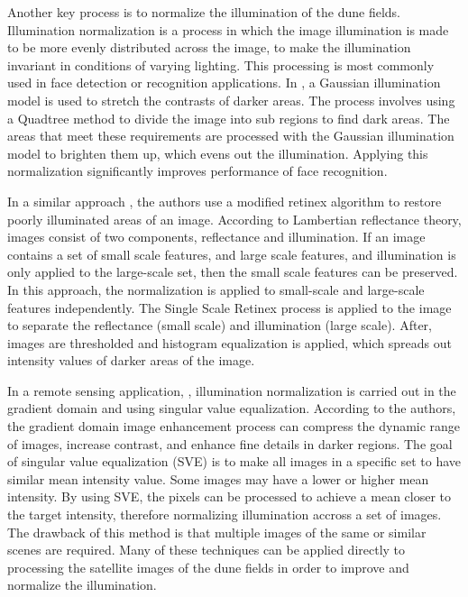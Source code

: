 Another key process is to normalize the illumination of the dune fields. Illumination normalization is a process in which the image illumination is made to be more evenly distributed across the image, to make the illumination invariant in conditions of varying lighting. This processing is most commonly used in face detection or recognition applications. In \cite{Illumination_normalization_based_on_2d_gaussian_model}, a Gaussian illumination model is used to stretch the contrasts of darker areas. The process involves using a Quadtree method to divide the image into sub regions to find dark areas. The areas that meet these requirements are processed with the Gaussian illumination model to brighten them up, which evens out the illumination. Applying this normalization significantly improves performance of face recognition.

In a similar approach \cite{Illumination_normalization_for_image_restoration_using_modified_retinex_algorithm}, the authors use a modified retinex algorithm to restore poorly illuminated areas of an image. According to Lambertian reflectance theory, images consist of two components, reflectance and illumination. If an image contains a set of small scale features, and large scale features, and illumination is only applied to the large-scale set, then the small scale features can be preserved. In this approach, the normalization is applied to small-scale and large-scale features independently. The Single Scale Retinex process is applied to the image to separate	the reflectance (small scale) and illumination (large scale). After, images are thresholded and histogram equalization is applied, which spreads out intensity values of darker areas of the image.

In a remote sensing application, \cite{Illumination_normalization_among_multiple_remote_senging_images}, illumination normalization is carried out in the gradient domain and using singular value equalization. According to the authors, the gradient domain image enhancement process can compress the dynamic range of images, increase contrast, and enhance fine details in darker regions. The goal of singular value equalization (SVE) is to make all images in a specific set to have similar mean intensity value. Some images may have a lower or higher mean intensity. By using SVE, the pixels can be processed to achieve a mean closer to the target intensity, therefore normalizing illumination accross a set of images. The drawback of this method is that multiple images of the same or similar scenes are required. Many of these techniques can be applied directly to processing the satellite images of the dune fields in order to improve and normalize the illumination.


